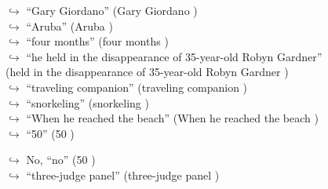 \documentclass[11pt,a4paper, onecolumn]{article}
\begin{document}
\begin{figure}[t] \small \begin{tcolorbox}[boxsep=0pt,left=5pt,right=0pt,top=2pt,colback = yellow!5] \begin{dialogue}
 \small 
\colorbox{pink!25}{$\hookrightarrow$}
{ ``Gary Giordano'' (Gary Giordano ) }
\\
\colorbox{pink!25}{$\hookrightarrow$}
{ ``Aruba'' (Aruba ) }
\\
\colorbox{pink!25}{$\hookrightarrow$}
{ ``four months'' (four months ) }
\\
\colorbox{pink!25}{$\hookrightarrow$}
{ ``he held in the disappearance of 35-year-old Robyn Gardner'' (held in the disappearance of 35-year-old Robyn Gardner ) }
\\
\colorbox{pink!25}{$\hookrightarrow$}
{ ``traveling companion'' (traveling companion ) }
\\
\colorbox{pink!25}{$\hookrightarrow$}
{ ``snorkeling'' (snorkeling ) }
\\
\colorbox{pink!25}{$\hookrightarrow$}
{ ``When he reached the beach'' (When he reached the beach ) }
\\
\colorbox{pink!25}{$\hookrightarrow$}
{ ``50'' (50 ) }
 \end{dialogue}\end{tcolorbox}\end{figure}\begin{figure}[t] \small \begin{tcolorbox}[boxsep=0pt,left=5pt,right=0pt,top=2pt,colback = yellow!5] \begin{dialogue}
 \small 
\colorbox{pink!25}{$\hookrightarrow$}
\colorbox{red!25}{No,}
{ ``no'' (50 ) }
\\
\colorbox{pink!25}{$\hookrightarrow$}
{ ``three-judge panel'' (three-judge panel ) }
\\

\end{dialogue}
\end{tcolorbox}
\end{figure}
\end{document}
